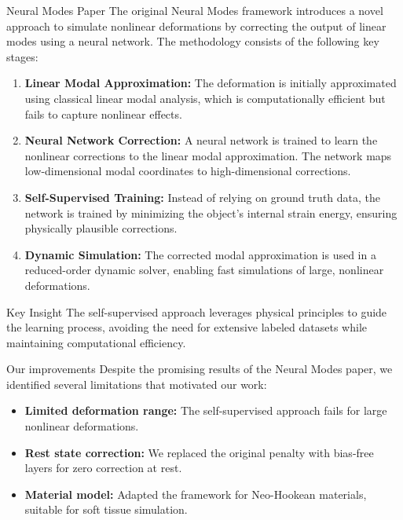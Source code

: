 \documentclass{beamer}
\begin{document}
\begin{frame}[allowframebreaks]{Neural Modes Paper}
    The original Neural Modes framework \cite{Wang_Du_Coros_Thomaszewski_2024} introduces a novel approach to simulate nonlinear deformations by correcting the output of linear modes using a neural network. The methodology consists of the following key stages:
    
    \begin{enumerate}
        \item \textbf{Linear Modal Approximation:} The deformation is initially approximated using classical linear modal analysis, which is computationally efficient but fails to capture nonlinear effects.
        \vspace{1em}
        \item \textbf{Neural Network Correction:} A neural network is trained to learn the nonlinear corrections to the linear modal approximation. The network maps low-dimensional modal coordinates to high-dimensional corrections.
        \vspace{1em}
        \item \textbf{Self-Supervised Training:} Instead of relying on ground truth data, the network is trained by minimizing the object's internal strain energy, ensuring physically plausible corrections.
        \vspace{1em}
        \item \textbf{Dynamic Simulation:} The corrected modal approximation is used in a reduced-order dynamic solver, enabling fast simulations of large, nonlinear deformations.
    \end{enumerate}
    
    \begin{alertblock}{Key Insight}
        The self-supervised approach leverages physical principles to guide the learning process, avoiding the need for extensive labeled datasets while maintaining computational efficiency.
    \end{alertblock}
\end{frame}

\begin{frame}{Our improvements}
    Despite the promising results of the Neural Modes paper, we identified several limitations that motivated our work:
    \begin{itemize}
        \item \textbf{Limited deformation range:} The self-supervised approach fails for large nonlinear deformations.
          \item \textbf{Rest state correction:} We replaced the original penalty with bias-free layers for zero correction at rest.
          \item \textbf{Material model:} Adapted the framework for Neo-Hookean materials, suitable for soft tissue simulation.    
    \end{itemize}
\end{frame}
\end{document}
